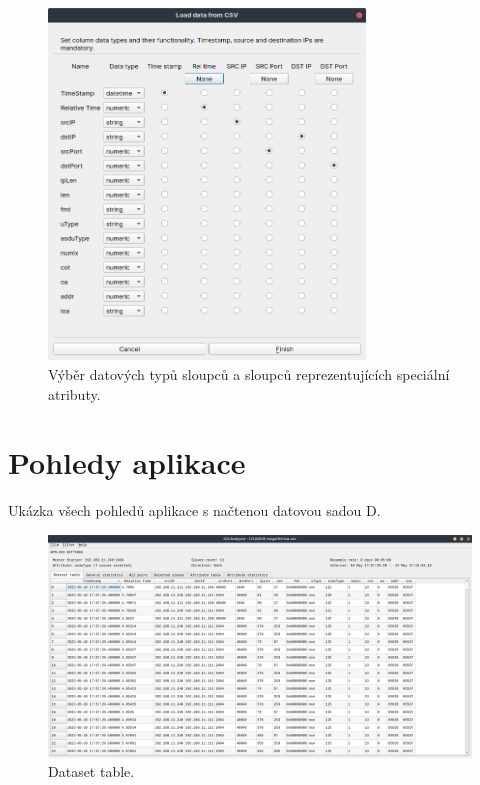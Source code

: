 \begin{figure}[H]
    \centering
    \includegraphics[width=0.75\textwidth]{obrazky-figures/load_csv_types.png}
    \caption{Výběr datových typů sloupců a sloupců reprezentujících speciální atributy.}
    \label{fig:type_select_screen}
\end{figure}


\chapter{Pohledy aplikace}
\label{panel_images}

Ukázka všech pohledů aplikace s načtenou datovou sadou D.

\begin{figure}[H]
	\centering
	\includegraphics[width=1\textwidth]{obrazky-figures/tabs/tab1.png}
	\caption{Dataset table.}
	\label{fig:tab1}
\end{figure}



